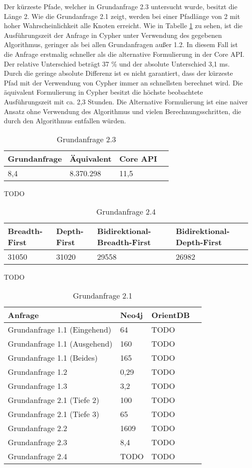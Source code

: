 \FloatBarrier
Der kürzeste Pfade, welcher in Grundanfrage 2.3 untersucht wurde, besitzt die Länge 2. Wie die Grundanfrage 2.1 zeigt, werden bei einer Pfadlänge von 2 mit hoher Wahrscheinlichkeit alle Knoten erreicht. Wie in Tabelle \ref{tab:Query2_3} zu sehen, ist die Ausführungszeit der Anfrage in Cypher unter Verwendung des gegebenen Algorithmus, geringer als bei allen Grundanfragen außer 1.2. In diesem Fall ist die Anfrage erstmalig schneller als die alternative Formulierung in der Core API. Der relative Unterschied beträgt 37 \% und  der absolute Unterschied 3,1 ms. Durch die geringe absolute Differenz ist es nicht garantiert, dass der kürzeste Pfad mit der Verwendung von Cypher immer an schnellsten berechnet wird. \newline
Die äquivalent Formulierung in Cypher besitzt die höchste beobachtete Ausführungszeit mit ca. 2,3 Stunden. Die Alternative Formulierung ist eine naiver Ansatz ohne Verwendung des Algorithmus und vielen Berechnungsschritten, die durch den Algorithmus entfallen würden.
\FloatBarrier
\begin{table}[!htb]
	\centering
		\begin{tabular}{ |p{3cm}|p{3cm}|p{3cm}|p{3cm}|  }
			\hline
			Grundanfrage & Äquivalent&Core API\\
			\hline
			8,4    & 8.370.298 &  11,5\\
			\hline
		\end{tabular}
		\caption{Grundanfrage 2.3}
		\label{tab:Query2_3}
\end{table}
\FloatBarrier
TODO
\FloatBarrier
\begin{table}[!htb]
	\centering
	\begin{tabular}{ |p{3cm}|p{3cm}|p{3cm}|p{3cm}|  }
		\hline
		Breadth-First & Depth-First&Bidirektional-Breadth-First &Bidirektional-Depth-First\\
		\hline
		 31050 & 31020    &  29558  &  26982\\
		\hline
	\end{tabular}
	\caption{Grundanfrage 2.4}
\end{table}
\FloatBarrier
TODO
\FloatBarrier
\begin{table}[h]
	\centering
	\begin{tabular}{ |p{7cm}||p{3cm}|p{3cm}|p{3cm}|  }
		\hline
		Anfrage& Neo4j & OrientDB\\
		\hline
	Grundanfrage 1.1 (Eingehend)   &  64    & TODO\\
	Grundanfrage 1.1 (Ausgehend)  & 160    & TODO\\
	Grundanfrage 1.1 (Beides)  & 165    & TODO\\
	Grundanfrage 1.2  & 0,29  & TODO   \\
	Grundanfrage 1.3  & 3,2  & TODO   \\
	Grundanfrage 2.1 (Tiefe 2)  & 100  & TODO   \\
	Grundanfrage 2.1 (Tiefe 3) & 65  & TODO   \\
	Grundanfrage 2.2  & 1609  & TODO   \\
	Grundanfrage 2.3  & 8,4  & TODO   \\
	Grundanfrage 2.4  & TODO  & TODO   \\
		\hline
	\end{tabular}
	\caption{Grundanfrage 2.1}
\end{table}
